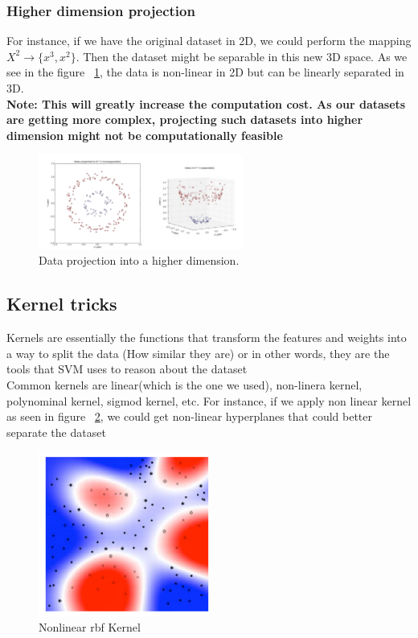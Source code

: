 \documentclass[11pt]{article}
\begin{document}
\subsubsection{Higher dimension projection}
For instance, if we have the original dataset in 2D, we could perform the mapping $X^2 \rightarrow \{x^3,x^2\}$. Then the dataset might be separable in this new 3D space. As we see in the figure ~\ref{fig:projection}, the data is non-linear in 2D but can be linearly separated in 3D. \\
\textbf{Note: This will greatly increase the computation cost. As our datasets are getting more complex, projecting such datasets into higher dimension might not be computationally feasible }
\begin{figure}[H]
    \centering
    \includegraphics[width=0.6\textwidth]{images/projection.png}
    \caption{Data projection into a higher dimension.}
    \label{fig:projection}
\end{figure}

\subsection{Kernel tricks}
Kernels are essentially the functions that transform the features and weights into a way to split the data (How similar they are) or in other words, they are the tools that SVM uses to reason about the dataset\\

Common kernels are linear(which is the one we used), non-linera kernel, polynominal kernel, sigmod kernel, etc. 
For instance, if we apply non linear kernel as seen in figure ~\ref{fig:kernel}, we could get non-linear hyperplanes that could better separate the dataset 
\begin{figure}[H]
    \centering
    \includegraphics[width=0.5\textwidth]{images/kernel.png}
    \caption{Nonlinear rbf Kernel}
    \label{fig:kernel}
\end{figure}
\end{document}

